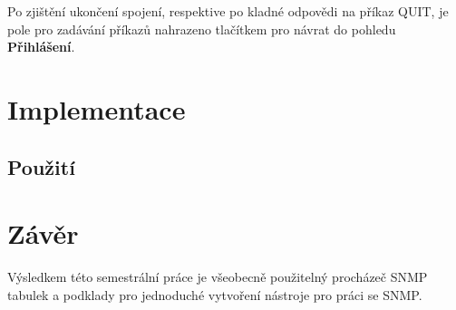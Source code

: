 \documentclass[12pt,a4paper]{article}
\let\oldsection\section
\renewcommand\section{\clearpage\oldsection}
\begin{document}
Po zjištění ukončení spojení, respektive po kladné odpovědi na příkaz QUIT, je pole pro zadávání příkazů nahrazeno tlačítkem pro návrat do pohledu \textbf{Přihlášení}.

\section{Implementace}



\subsection{Použití}


\begin{figure}

\end{figure}

\section{Závěr}
Výsledkem této semestrální práce je všeobecně použitelný procházeč SNMP tabulek a podklady pro jednoduché vytvoření nástroje pro práci se SNMP.


\end{document}
